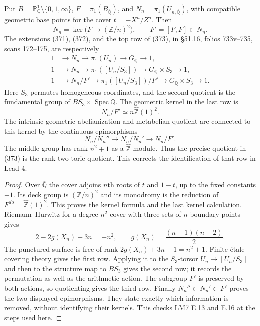 \begin{proposition}
\label{E-three-maps}
Put $B=\mathbb P^1_{\mathbb Q}\setminus\{0,1,\infty\}$,
$F=\pi_1(B_{\overline{\mathbb Q}})$, and
$N_n=\pi_1(U_{n,\overline{\mathbb Q}})$, with compatible
geometric base points for the cover
$t=-X^n/Z^n$. Then
\[
 N_n=\ker\bigl(F\longrightarrow(\mathbb Z/n)^2\bigr),
 \qquad F'=\overline{[F,F]}\subset N_n.
\]
The extensions (371), (372), and the top row of (373), in
\S51.16, folios 733v--735, scans 172--175, are respectively
\begin{align*}
 1&\longrightarrow N_n\longrightarrow\pi_1(U_n)
                 \longrightarrow G_{\mathbb Q}\longrightarrow1,\\
 1&\longrightarrow N_n\longrightarrow\pi_1([U_n/S_3])
                 \longrightarrow G_{\mathbb Q}\times S_3\longrightarrow1,\\
 1&\longrightarrow N_n/F'\longrightarrow\pi_1([U_n/S_3])/F'
                 \longrightarrow G_{\mathbb Q}\times S_3\longrightarrow1.
\end{align*}
Here $S_3$ permutes homogeneous coordinates, and the second
quotient is the fundamental group of $BS_3\times\operatorname{Spec}\mathbb Q$.
The geometric kernel in the last row is
\[
 N_n/F'\simeq n\widehat{\mathbb Z}(1)^2.
\]
The intrinsic geometric abelianization and metabelian quotient
are connected to this kernel by the continuous epimorphisms
\[
 N_n/N_n''\longrightarrow N_n/N_n'\longrightarrow N_n/F'.
\]
The middle group has rank $n^2+1$ as a
$\widehat{\mathbb Z}$-module. Thus the precise quotient in
(373) is the rank-two toric quotient. This corrects the
identification of that row in Lead 4.
\end{proposition}
\begin{proof}
Over $\overline{\mathbb Q}$ the cover adjoins $n$th roots of
$t$ and $1-t$, up to the fixed constants $-1$.
Its deck group is $(\mathbb Z/n)^2$ and its monodromy is
the reduction of $F^{\mathrm{ab}}=\widehat{\mathbb Z}(1)^2$.
This proves the kernel formula and the last kernel calculation.
Riemann--Hurwitz for a degree $n^2$ cover with three sets of
$n$ boundary points gives
\[
 2-2g(X_n)-3n=-n^2,\qquad
 g(X_n)=\frac{(n-1)(n-2)}2.
\]
The punctured surface is free of rank
$2g(X_n)+3n-1=n^2+1$. Finite étale covering theory gives
the first row. Applying it to the $S_3$-torsor
$U_n\to[U_n/S_3]$ and then to the structure map to
$BS_3$ gives the second row; it records the permutation
as well as the arithmetic action. The subgroup $F'$
is preserved by both actions, so quotienting gives
the third row. Finally $N_n''\subset N_n'\subset F'$
proves the two displayed epimorphisms. They state
exactly which information is removed, without identifying
their kernels. This checks LM7 E.13 and E.16 at the
steps used here.
\end{proof}

